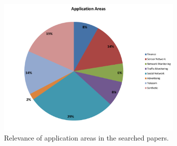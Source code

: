 \documentclass[ppgc,diss,english]{iiufrgs}
\begin{document}
\begin{figure}[!ht]
	\centering
	\includegraphics[width=0.8\textwidth]{images/ApplicationSelection.pdf}
	\caption{Relevance of application areas in the searched papers.}
	\label{fig:app_selection_areas}
\end{figure}


\end{document}

